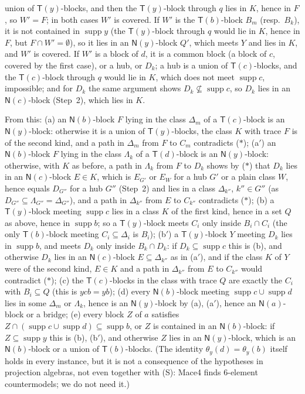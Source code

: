 \documentclass[11pt]{amsart}
\theoremstyle{definition}
\newcommand{\supp}{\operatorname{supp}}
\newcommand{\T}{\mathsf{T}}
\newcommand{\N}{\mathsf{N}}
\begin{document}
union of $\T(y)$-blocks, and then the $\T(y)$-block through $q$ lies in $K$, hence in $F$, so $W'=F$; in both cases $W'$ is covered. If $W'$ is the $\T(b)$-block $B_m$ (resp.\ $B_k$), it is not contained in $\supp y$ (the $\T(y)$-block through $q$ would lie in $K$, hence in $F$, but $F\cap W'=\emptyset$), so it lies in an $\N(y)$-block $Q'$, which meets $Y$ and lies in $K$, and $W'$ is covered. If $W'$ is a block of $d$, it is a common block (a block of $c$, covered by the first case), or a hub, or $D_k$; a hub is a union of $\T(c)$-blocks, and the $\T(c)$-block through $q$ would lie in $K$, which does not meet $\supp c$, impossible; and for $D_k$ the same argument shows $D_k\not\subseteq\supp c$, so $D_k$ lies in an $\N(c)$-block (Step~2), which lies in $K$.

From this: (a) an $\N(b)$-block $F$ lying in the class $\Delta_m$ of a $\T(c)$-block is an $\N(y)$-block: otherwise it is a union of $\T(y)$-blocks, the class $K$ with trace $F$ is of the second kind, and a path in $\Delta_m$ from $F$ to $C_m$ contradicts ($*$); (a$'$) an $\N(b)$-block $F$ lying in the class $\Lambda_k$ of a $\T(d)$-block is an $\N(y)$-block: otherwise, with $K$ as before, a path in $\Lambda_k$ from $F$ to $D_k$ shows by ($*$) that $D_k$ lies in an $\N(c)$-block $E\in K$, which is $E_{G'}$ or $E_W$ for a hub $G'$ or a plain class $W$, hence equals $D_{G''}$ for a hub $G''$ (Step~2) and lies in a class $\Delta_{k''}$, $k''\in G''$ (as $D_{G''}\subseteq\Lambda_{G''}=\Delta_{G''}$), and a path in $\Delta_{k''}$ from $E$ to $C_{k''}$ contradicts ($*$); (b) a $\T(y)$-block meeting $\supp c$ lies in a class $K$ of the first kind, hence in a set $Q$ as above, hence in $\supp b$; so a $\T(y)$-block meets $C_i$ only inside $B_i\cap C_i$ (the only $\T(b)$-block meeting $C_i\subseteq\Delta_i$ is $B_i$); (b$'$) a $\T(y)$-block $Y$ meeting $D_k$ lies in $\supp b$, and meets $D_k$ only inside $B_k\cap D_k$: if $D_k\subseteq\supp c$ this is (b), and otherwise $D_k$ lies in an $\N(c)$-block $E\subseteq\Delta_{k''}$ as in (a$'$), and if the class $K$ of $Y$ were of the second kind, $E\in K$ and a path in $\Delta_{k''}$ from $E$ to $C_{k''}$ would contradict ($*$); (c) the $\T(c)$-blocks in the class with trace $Q$ are exactly the $C_i$ with $B_i\subseteq Q$ (this is $ycb=yb$); (d) every $\N(b)$-block meeting $\supp c\cup\supp d$ lies in some $\Delta_m$ or $\Lambda_k$, hence is an $\N(y)$-block by (a), (a$'$), hence an $\N(a)$-block or a bridge; (e) every block $Z$ of $a$ satisfies $Z\cap(\supp c\cup\supp d)\subseteq\supp b$, or $Z$ is contained in an $\N(b)$-block: if $Z\subseteq\supp y$ this is (b), (b$'$), and otherwise $Z$ lies in an $\N(y)$-block, which is an $\N(b)$-block or a union of $\T(b)$-blocks. (The identity $\theta_y(d)=\theta_y(b)$ itself holds in every instance, but it is not a consequence of the hypotheses in projection algebras, not even together with (S): Mace4 finds $6$-element countermodels; we do not need it.)
\end{document}
